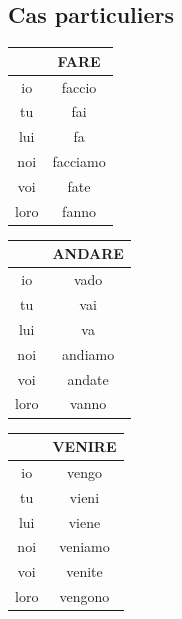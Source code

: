\documentclass[12pt, openany]{report}
\begin{document}
\subsection{Cas particuliers}
\begin{minipage}{.315\textwidth}
    \begin{center}
        \begin{tabular}{c||c}
            & FARE\\ \hline
            io & faccio\\
            tu & fai\\
            lui & fa\\
            noi & facciamo\\
            voi & fate\\
            loro & fanno\\
        \end{tabular}
    \end{center}
\end{minipage}
\begin{minipage}{.315\textwidth}
    \begin{center}
        \begin{tabular}{c||c}
            & ANDARE\\ \hline
            io & vado\\
            tu & vai\\
            lui & va\\
            noi & andiamo\\
            voi & andate\\
            loro & vanno\\
        \end{tabular}
    \end{center}
\end{minipage}
\begin{minipage}{.315\textwidth}
    \begin{center}
        \begin{tabular}{c||c}
            & VENIRE\\ \hline
            io & vengo\\
            tu & vieni\\
            lui & viene\\
            noi & veniamo\\
            voi & venite\\
            loro & vengono\\
        \end{tabular}
    \end{center}
\end{minipage}
\end{document}
